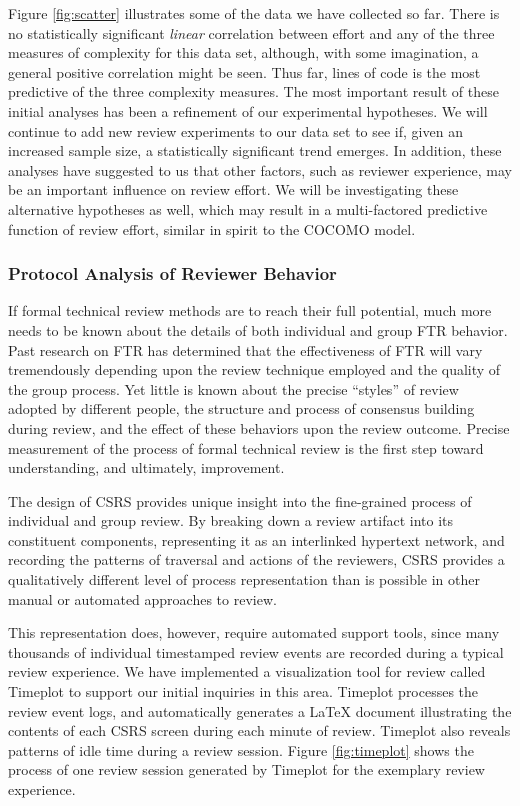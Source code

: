 Figure \ref{fig:scatter} illustrates some of the data we have collected so
far.  There is no statistically significant {\em linear} correlation between effort and
any of the three measures of complexity for this data set, although, with
some imagination, a general positive correlation might be seen.  Thus far,
lines of code is the most predictive of the three complexity
measures. The most important result of these initial analyses has been a
refinement of our experimental hypotheses.  We will continue to add new
review experiments to our data set to see if, given an increased sample
size, a statistically significant trend emerges.  In addition, these
analyses have suggested to us that other factors, such as reviewer
experience, may be an important influence on review effort.  We will be
investigating these alternative hypotheses as well, which may result in a
multi-factored predictive function of review effort, similar in spirit to
the COCOMO model.

\subsubsection{Protocol Analysis of Reviewer Behavior}

If formal technical review methods are to reach their full potential, much
more needs to be known about the details of both individual and group FTR
behavior.  Past research on FTR has determined that the effectiveness of
FTR will vary tremendously depending upon the review technique employed and
the quality of the group process.  Yet little is known about the precise
``styles'' of review adopted by different people, the structure and process
of consensus building during review, and the effect of these behaviors upon
the review outcome.  Precise measurement of the process of formal technical
review is the first step toward understanding, and ultimately, improvement.

The design of CSRS provides unique insight into the fine-grained process of
individual and group review.  By breaking down a review artifact into
its constituent components, representing it as an interlinked hypertext
network, and recording the patterns of traversal and actions of the
reviewers, CSRS provides a qualitatively different level of 
process representation than is possible in other manual or automated
approaches to review.

This representation does, however, require automated support tools, since
many thousands of individual timestamped review events are recorded during
a typical review experience.  We have implemented a visualization tool for
review called Timeplot to support our initial inquiries in this area.
Timeplot processes the review event logs, and automatically generates a
LaTeX document illustrating the contents of each CSRS screen during each
minute of review.  Timeplot also reveals patterns of idle time during 
a review session.  Figure \ref{fig:timeplot} shows the process 
of one review session generated by Timeplot for the exemplary review 
experience. 
 


